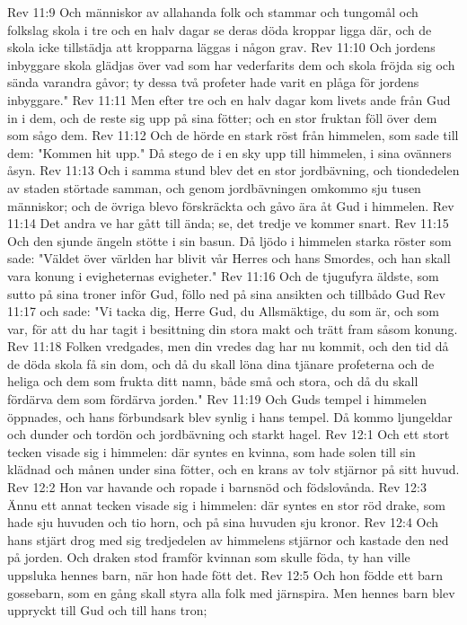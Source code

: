 Rev 11:9  Och människor av allahanda folk och stammar och tungomål och folkslag skola i tre och en halv dagar se deras döda kroppar ligga där, och de skola icke tillstädja att kropparna läggas i någon grav.
Rev 11:10  Och jordens inbyggare skola glädjas över vad som har vederfarits dem och skola fröjda sig och sända varandra gåvor; ty dessa två profeter hade varit en plåga för jordens inbyggare."
Rev 11:11  Men efter tre och en halv dagar kom livets ande från Gud in i dem, och de reste sig upp på sina fötter; och en stor fruktan föll över dem som sågo dem.
Rev 11:12  Och de hörde en stark röst från himmelen, som sade till dem: "Kommen hit upp." Då stego de i en sky upp till himmelen, i sina ovänners åsyn.
Rev 11:13  Och i samma stund blev det en stor jordbävning, och tiondedelen av staden störtade samman, och genom jordbävningen omkommo sju tusen människor; och de övriga blevo förskräckta och gåvo ära åt Gud i himmelen.
Rev 11:14  Det andra ve har gått till ända; se, det tredje ve kommer snart.
Rev 11:15  Och den sjunde ängeln stötte i sin basun. Då ljödo i himmelen starka röster som sade: "Väldet över världen har blivit vår Herres och hans Smordes, och han skall vara konung i evigheternas evigheter."
Rev 11:16  Och de tjugufyra äldste, som sutto på sina troner inför Gud, föllo ned på sina ansikten och tillbådo Gud
Rev 11:17  och sade: "Vi tacka dig, Herre Gud, du Allsmäktige, du som är, och som var, för att du har tagit i besittning din stora makt och trätt fram såsom konung.
Rev 11:18  Folken vredgades, men din vredes dag har nu kommit, och den tid då de döda skola få sin dom, och då du skall löna dina tjänare profeterna och de heliga och dem som frukta ditt namn, både små och stora, och då du skall fördärva dem som fördärva jorden."
Rev 11:19  Och Guds tempel i himmelen öppnades, och hans förbundsark blev synlig i hans tempel. Då kommo ljungeldar och dunder och tordön och jordbävning och starkt hagel.
Rev 12:1  Och ett stort tecken visade sig i himmelen: där syntes en kvinna, som hade solen till sin klädnad och månen under sina fötter, och en krans av tolv stjärnor på sitt huvud.
Rev 12:2  Hon var havande och ropade i barnsnöd och födslovånda.
Rev 12:3  Ännu ett annat tecken visade sig i himmelen: där syntes en stor röd drake, som hade sju huvuden och tio horn, och på sina huvuden sju kronor.
Rev 12:4  Och hans stjärt drog med sig tredjedelen av himmelens stjärnor och kastade den ned på jorden. Och draken stod framför kvinnan som skulle föda, ty han ville uppsluka hennes barn, när hon hade fött det.
Rev 12:5  Och hon födde ett barn gossebarn, som en gång skall styra alla folk med järnspira. Men hennes barn blev uppryckt till Gud och till hans tron;
